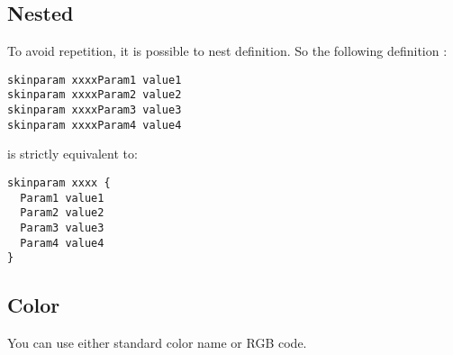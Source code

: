 \subsection{Nested}
To avoid repetition, it is possible to nest definition. So the following definition :

\begin{lstlisting}
skinparam xxxxParam1 value1
skinparam xxxxParam2 value2
skinparam xxxxParam3 value3
skinparam xxxxParam4 value4
\end{lstlisting}
		

is strictly equivalent to:

\begin{lstlisting}
skinparam xxxx {
  Param1 value1
  Param2 value2
  Param3 value3
  Param4 value4
}
\end{lstlisting}
		



 
\newpage \subsection{Color}

You can use either standard color name or RGB code.
\vskip 12mm

\newcommand{\firstCell}{\texttt}
 

